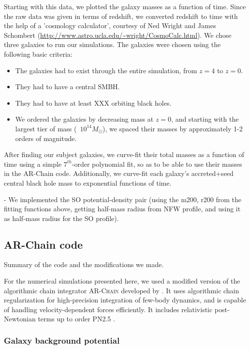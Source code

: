 \documentclass[english, apj]{emulateapj}
\begin{document}
Starting with this data, we plotted the galaxy masses as a function of time.  Since the raw data was given in terms of redshift, we converted redshift to time with the help of a 'cosmology calculator', courtesy of Ned Wright and James Schombert (\url{http://www.astro.ucla.edu/~wright/CosmoCalc.html}).  We chose three galaxies to run our simulations.  The galaxies were chosen using the following basic criteria:
\begin{itemize}
\item The galaxies had to exist through the entire simulation, from $z=4$ to $z=0$.
\item They had to have a central SMBH.
\item They had to have at least XXX orbiting black holes.
\item We ordered the galaxies by decreasing mass at $z=0$, and starting with the largest tier of mass (~$10^{14} M_{\odot}$), we spaced their masses by approximately 1-2 orders of magnitude.
\end{itemize}

After finding our subject galaxies, we curve-fit their total masses as a function of time using a simple $7^{th}$-order polynomial fit, so as to be able to use their masses in the AR-Chain code.  Additionally, we curve-fit each galaxy's accreted+seed central black hole mass to exponential functions of time.

- We implemented the SO potential-density pair (using the m200, r200 from the fitting functions above, getting half-mass radius from NFW profile, and using it as half-mass radius for the SO profile).


\subsection{AR-Chain code}
Summary of the code and the modifications we made.

For the numerical simulations presented here, we used a modified version of the algorithmic chain integrator \textsc{AR-Chain} developed by \citet{2006MNRAS.372..219M}. It uses algorithmic chain regularization for high-precision integration of few-body dynamics, and is capable of handling velocity-dependent forces efficiently. It includes relativistic post-Newtonian terms up to order PN2.5 \citep{2008AJ....135.2398M}.


\subsubsection{Galaxy background potential}
\end{document}
